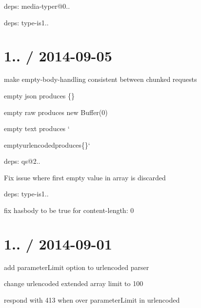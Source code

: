 \begin{DoxyItemize}
\item deps\+: media-\/typer@0..
\item deps\+: type-\/is1..
\end{DoxyItemize}

\section*{1.. / 2014-\/09-\/05 }


\begin{DoxyItemize}
\item make empty-\/body-\/handling consistent between chunked requests
\begin{DoxyItemize}
\item empty {\ttfamily json} produces {\ttfamily \{\}}
\item empty {\ttfamily raw} produces {\ttfamily new Buffer(0)}
\item empty {\ttfamily text} produces `\textquotesingle{}\textquotesingle{}{\ttfamily }
\item {\ttfamily empty}urlencoded{\ttfamily produces}\{\}`
\end{DoxyItemize}
\item deps\+: qs@2..
\begin{DoxyItemize}
\item Fix issue where first empty value in array is discarded
\end{DoxyItemize}
\item deps\+: type-\/is1..
\begin{DoxyItemize}
\item fix {\ttfamily hasbody} to be true for {\ttfamily content-\/length\+: 0}
\end{DoxyItemize}
\end{DoxyItemize}

\section*{1.. / 2014-\/09-\/01 }


\begin{DoxyItemize}
\item add {\ttfamily parameter\+Limit} option to {\ttfamily urlencoded} parser
\item change {\ttfamily urlencoded} extended array limit to 100
\item respond with 413 when over {\ttfamily parameter\+Limit} in {\ttfamily urlencoded}
\end{DoxyItemize}

